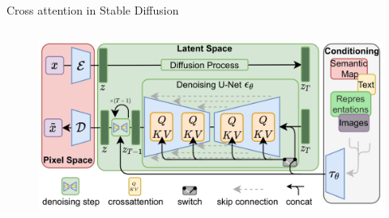 \documentclass[8pt]{beamer}
\begin{document}
\begin{frame}{Cross attention in Stable Diffusion}
\begin{columns}
\begin{column}{0.5\textwidth}
\begin{minipage}{\textwidth}
\begin{figure}
                \label{fig:image_generation_algorithm}
             \end{figure}
        \end{minipage}
        \begin{minipage}{\textwidth}
             \begin{figure}
                \includegraphics[scale=0.09]{images/sd_non_annotated}
                \label{fig:image_generation_algorithm}
             \end{figure}~\cite{rombach2022highresolution}
        \end{minipage}
      \end{column}
   \end{columns}
\end{frame}
\end{document}

